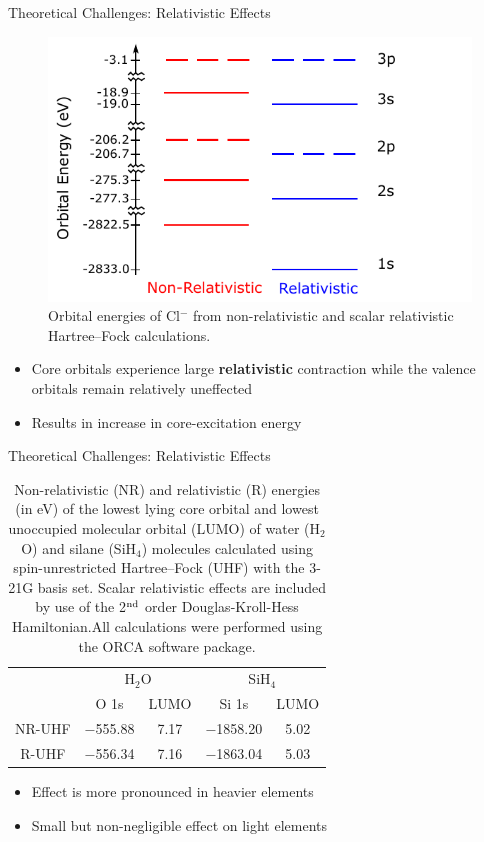 \documentclass[t]{beamer}
\begin{document}
\begin{frame}{Theoretical Challenges: Relativistic Effects}
\begin{figure}
\includegraphics[scale=0.8]{relativistic_contraction.pdf}
\caption*{Orbital energies of Cl$^{-}$ from non-relativistic and scalar relativistic Hartree--Fock calculations.}
\end{figure}
\begin{itemize}
\item Core orbitals experience large \textbf{relativistic} contraction while the valence orbitals remain relatively uneffected
\item Results in increase in core-excitation energy
\end{itemize}
\end{frame}

\begin{frame}{Theoretical Challenges: Relativistic Effects}
\begin{table}
\centering
\caption{Non-relativistic (NR) and relativistic (R) energies (in eV) of the lowest lying core orbital and lowest unoccupied molecular orbital (LUMO) of water (H$_2$O) and silane (SiH$_4$) molecules calculated using spin-unrestricted Hartree--Fock (UHF) with the 3-21G basis set. Scalar relativistic effects are included by use of the 2$^{\rm nd}$ order Douglas-Kroll-Hess Hamiltonian.\footnotemark All calculations were performed using the ORCA software package.}
\begin{tabular}{ccccc}
\toprule
& \multicolumn{2}{c}{H$_2$O} & \multicolumn{2}{c}{SiH$_4$} \\ \cmidrule(lr){2-3} \cmidrule(lr){4-5}
& O 1s & LUMO & Si 1s & LUMO \\
\hline
NR-UHF & $-$555.88 & 7.17 & $-$1858.20 & 5.02\\
R-UHF & $-$556.34 & 7.16 & $-$1863.04 & 5.03\\
\bottomrule
\end{tabular}
\label{tab:rel_effects}
\end{table}
\begin{itemize}
\item Effect is more pronounced in heavier elements
\item Small but non-negligible effect on light elements 
\end{itemize}
\end{frame}
\end{document}
